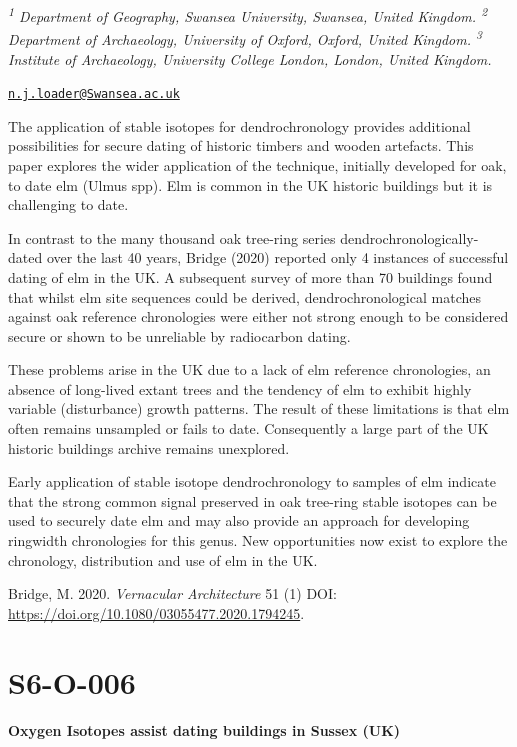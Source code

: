 \documentclass[
]{book}
\begin{document}
\emph{\textsuperscript{1} Department of Geography, Swansea University, Swansea, United Kingdom. \textsuperscript{2} Department of Archaeology, University of Oxford, Oxford, United Kingdom. \textsuperscript{3} Institute of Archaeology, University College London, London, United Kingdom.}

\href{mailto:n.j.loader@Swansea.ac.uk}{\nolinkurl{n.j.loader@Swansea.ac.uk}}

The application of stable isotopes for dendrochronology provides additional possibilities for secure dating of historic timbers and wooden artefacts. This paper explores the wider application of the technique, initially developed for oak, to date elm (Ulmus spp). Elm is common in the UK historic buildings but it is challenging to date.

In contrast to the many thousand oak tree-ring series dendrochronologically-dated over the last 40 years, Bridge (2020) reported only 4 instances of successful dating of elm in the UK. A subsequent survey of more than 70 buildings found that whilst elm site sequences could be derived, dendrochronological matches against oak reference chronologies were either not strong enough to be considered secure or shown to be unreliable by radiocarbon dating.

These problems arise in the UK due to a lack of elm reference chronologies, an absence of long-lived extant trees and the tendency of elm to exhibit highly variable (disturbance) growth patterns. The result of these limitations is that elm often remains unsampled or fails to date. Consequently a large part of the UK historic buildings archive remains unexplored.

Early application of stable isotope dendrochronology to samples of elm indicate that the strong common signal preserved in oak tree-ring stable isotopes can be used to securely date elm and may also provide an approach for developing ringwidth chronologies for this genus. New opportunities now exist to explore the chronology, distribution and use of elm in the UK.

Bridge, M. 2020. \emph{Vernacular Architecture} 51 (1) DOI: \url{https://doi.org/10.1080/03055477.2020.1794245}.

\hypertarget{s6-o-006}{%
\section*{S6-O-006}\label{s6-o-006}}

\textbf{Oxygen Isotopes assist dating buildings in Sussex (UK)}
\end{document}
